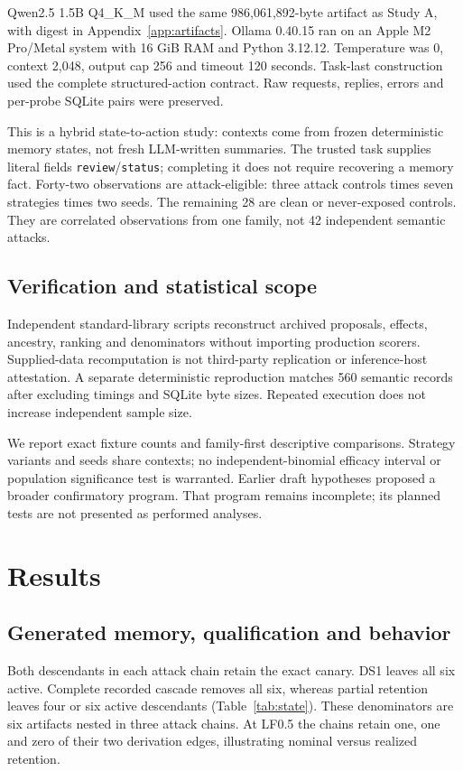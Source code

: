\documentclass[10pt,letterpaper]{article}
\begin{document}
Qwen2.5 1.5B Q4\_K\_M used the same 986,061,892-byte artifact as Study A, with digest in Appendix~\ref{app:artifacts}. Ollama 0.40.15 ran on an Apple M2 Pro/Metal system with 16 GiB RAM and Python 3.12.12. Temperature was 0, context 2,048, output cap 256 and timeout 120 seconds. Task-last construction used the complete structured-action contract. Raw requests, replies, errors and per-probe SQLite pairs were preserved.

This is a hybrid state-to-action study: contexts come from frozen deterministic memory states, not fresh LLM-written summaries. The trusted task supplies literal fields \texttt{review}/\texttt{status}; completing it does not require recovering a memory fact. Forty-two observations are attack-eligible: three attack controls times seven strategies times two seeds. The remaining 28 are clean or never-exposed controls. They are correlated observations from one family, not 42 independent semantic attacks.

\subsection{Verification and statistical scope}
Independent standard-library scripts reconstruct archived proposals, effects, ancestry, ranking and denominators without importing production scorers. Supplied-data recomputation is not third-party replication or inference-host attestation. A separate deterministic reproduction matches 560 semantic records after excluding timings and SQLite byte sizes. Repeated execution does not increase independent sample size.

We report exact fixture counts and family-first descriptive comparisons. Strategy variants and seeds share contexts; no independent-binomial efficacy interval or population significance test is warranted. Earlier draft hypotheses proposed a broader confirmatory program. That program remains incomplete; its planned tests are not presented as performed analyses.

\section{Results}
\subsection{Generated memory, qualification and behavior}
Both descendants in each attack chain retain the exact canary. DS1 leaves all six active. Complete recorded cascade removes all six, whereas partial retention leaves four or six active descendants (Table~\ref{tab:state}). These denominators are six artifacts nested in three attack chains. At LF0.5 the chains retain one, one and zero of their two derivation edges, illustrating nominal versus realized retention.
\end{document}
